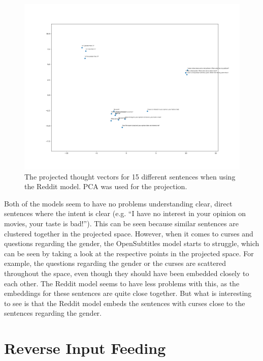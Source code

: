 \begin{figure}[H]
	\centering
	\includegraphics[width=16cm]{img/reddit_thought_vector_embeddings.png}
	\caption{The projected thought vectors for 15 different sentences when using the Reddit model. PCA was used for the projection.}
	\label{results:thougth_vectors:embeddings:reddit}
\end{figure}

Both of the models seem to have no problems understanding clear, direct sentences where the intent is clear (e.g. ``I have no interest in your opinion on movies, your taste is bad!''). This can be seen because similar sentences are clustered together in the projected space. However, when it comes to curses and questions regarding the gender, the OpenSubtitles model starts to struggle, which can be seen by taking a look at the respective points in the projected space. For example, the questions regarding the gender or the curses are scattered throughout the space, even though they should have been embedded closely to each other. The Reddit model seems to have less problems with this, as the embeddings for these sentences are quite close together. But what is interesting to see is that the Reddit model embeds the sentences with curses close to the sentences regarding the gender.

\section{Reverse Input Feeding}
\blindtext